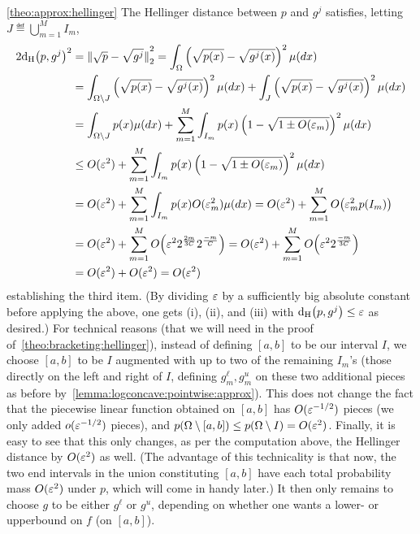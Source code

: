 \begin{proofof}{\cref{theo:approx:hellinger}}
The Hellinger distance between $p$ and $g^j$ satisfies, letting $J\eqdef \bigcup_{m=1}^M I_m$,
\begin{align*}
  2\hellinger{p}{g^j}^2 &= \normtwo{\sqrt{p}-\sqrt{g^j}}^2
    = \int_{\domain}\left(\sqrt{p(x)}-\sqrt{g^j(x)}\right)^2 \mu(dx) \\
    &= \int_{\domain\setminus J}\left(\sqrt{p(x)}-\sqrt{g^j(x)}\right)^2 \mu(dx)+\int_{J}\left(\sqrt{p(x)}-\sqrt{g^j(x)}\right)^2 \mu(dx)\\
    &= \int_{\domain\setminus J}p(x) \mu(dx)+\sum_{m=1}^M\int_{I_m}p(x)\left(1-\sqrt{1\pm O(\eps_m)}\right)^2 \mu(dx)\\
    &\leq O(\eps^2) + \sum_{m=1}^M\int_{I_m}p(x)\left(1-\sqrt{1\pm O(\eps_m)}\right)^2 \mu(dx) \\
    &= O(\eps^2) + \sum_{m=1}^M\int_{I_m}p(x)O(\eps_m^2) \mu(dx) 
    = O(\eps^2) + \sum_{m=1}^M \bigO{\eps_m^2 p(I_m)} \\
    &= O(\eps^2) + \sum_{m=1}^M \bigO{\eps^2 2^{\frac{2m}{3C}}2^{\frac{-m}{C}}} 
    = O(\eps^2) + \sum_{m=1}^M \bigO{\eps^2 2^{\frac{-m}{3C}}} \\
    &= O(\eps^2) + O(\eps^2) = O(\eps^2)
\end{align*}
establishing the third item. (By dividing $\varepsilon$ by a sufficiently big absolute constant before applying the above, one gets (i), (ii), and (iii) with ${\operatorname{d_{\rm{H}}}\!\left({p, g^j}\right)} \leq \varepsilon$ as desired.) For technical reasons (that we will need in the proof of~\cref{theo:bracketing:hellinger}), instead of defining $[a,b]$ to be our interval $I$, we choose $[a,b]$ to be $I$ augmented with up to two of the remaining $I_m$'s (those directly on the left and right of $I$, defining $g^\ell_m, g^u_m$ on these two additional pieces as before by~\cref{lemma:logconcave:pointwise:approx}). This does not change the fact that the piecewise linear function obtained on $[a,b]$ has $O(\varepsilon^{-1/2})$ pieces (we only added $o(\varepsilon^{-1/2})$ pieces), and $p({\Omega}\setminus [a,b])\leq p({\Omega}\setminus I) = O(\varepsilon^2)$. Finally, it is easy to see that this only changes, as per the computation above, the Hellinger distance by $O(\varepsilon^2)$ as well. (The advantage of this technicality is that now, the two end intervals in the union constituting  $[a,b]$ have each total probability mass $O(\varepsilon^2)$ under $p$, which will come in handy later.) It then only remains to choose $g$ to be either $g^\ell$ or $g^u$, depending on whether one wants a lower- or upperbound on $f$ (on $[a,b]$).
\end{proofof}

